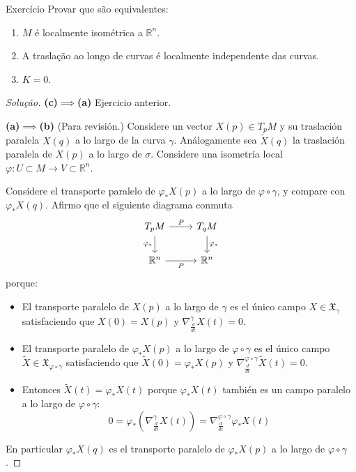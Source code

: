 \begin{thing6}{Exercício}\label{exer:}\leavevmode
Provar que são equivalentes:
\begin{enumerate}[label=(\alph*)]
\item \(M\) é localmente isométrica a \(\mathbb{R}^n\).
\item A traslação ao longo de curvas é localmente independente das curvas.
\item \(K=0\).
\end{enumerate}

\begin{proof}[Solução]\leavevmode
\textbf{(c)\(\implies\)(a)} Ejercicio anterior.

\textbf{(a)\(\implies\)(b)}  {\color{2}(Para revisión.)} Considere un vector \(X(p) \in T_pM\) y su traslación paralela \(X(q)\) a lo largo de la curva \(\gamma\). Análogamente sea \(\tilde{X}(q)\) la traslación paralela de \(X(p)\) a lo largo de \(\sigma\). Considere una isometría local  \(\varphi: U \subset M \to V \subset \mathbb{R}^n\).

Considere el transporte paralelo de \(\varphi_* X(p)\) a lo largo de \(\varphi \circ \gamma\), y compare con \(\varphi_*X(q)\). Afirmo que el siguiente diagrama conmuta
\[\begin{tikzcd}
	T_pM\arrow[r,"P"]\arrow[d,"\varphi_*",swap]&T_q M\arrow[d,"\varphi_*"]\\
	\mathbb{R}^n\arrow[r,swap,"P"]&\mathbb{R}^n
\end{tikzcd}\]
porque:
\begin{itemize}
\item El transporte paralelo de \(X(p)\) a lo largo de \(\gamma\) es el único campo \(X \in \mathfrak{X}_\gamma\) satisfaciendo que \(X(0)=X(p)\) y  \(\nabla_{\frac{d}{dt}}^\gamma X(t)=0\).
\item El transporte paralelo de \(\varphi_*X(p)\) a lo largo de \(\varphi \circ \gamma\) es el único campo \(\tilde{X} \in \mathfrak{X}_{\varphi \circ \gamma}\) satisfaciendo que \(\tilde{X}(0)=\varphi_*X(p)\) y \(\nabla_{\frac{d}{dt}}^{\varphi \circ \gamma}\tilde{X}(t)=0\).
\item Entonces \(\tilde{X}(t)=\varphi_*X(t)\) porque \(\varphi_*X(t)\) también es un campo paralelo a lo largo de \(\varphi \circ \gamma\):
\[0=\varphi_*\left(\nabla^\gamma_{\frac{d}{dt}}X(t)\right)=\nabla_{\frac{d}{dt}}^{\varphi \circ\gamma} \varphi_*X(t) \]
\end{itemize}
En particular \(\varphi_*X(q)\) es el transporte paralelo de \(\varphi_*X(p)\) a lo largo de \(\varphi \circ \gamma\).


\end{proof}
\end{thing6}
